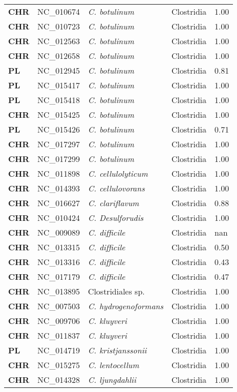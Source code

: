\begin{adjustwidth}{-3cm}{2cm}
{\begin{supertabular}{>{\bfseries}l|p{0.1\textwidth}p{0.14\textwidth}l|l}
CHR & NC\_010674 & \textit{C. botulinum} & Clostridia & 1.00\\
CHR & NC\_010723 & \textit{C. botulinum} & Clostridia & 1.00\\
CHR & NC\_012563 & \textit{C. botulinum} & Clostridia & 1.00\\
CHR & NC\_012658 & \textit{C. botulinum} & Clostridia & 1.00\\
PL & NC\_012945 & \textit{C. botulinum} & Clostridia & 0.81\\
PL & NC\_015417 & \textit{C. botulinum} & Clostridia & 1.00\\
PL & NC\_015418 & \textit{C. botulinum} & Clostridia & 1.00\\
CHR & NC\_015425 & \textit{C. botulinum} & Clostridia & 1.00\\
PL & NC\_015426 & \textit{C. botulinum} & Clostridia & 0.71\\
CHR & NC\_017297 & \textit{C. botulinum} & Clostridia & 1.00\\
CHR & NC\_017299 & \textit{C. botulinum} & Clostridia & 1.00\\
CHR & NC\_011898 & \textit{C. cellulolyticum} & Clostridia & 1.00\\
CHR & NC\_014393 & \textit{C. cellulovorans} & Clostridia & 1.00\\
CHR & NC\_016627 & \textit{C. clariflavum} & Clostridia & 0.88\\
CHR & NC\_010424 & \textit{C. Desulforudis} & Clostridia & 1.00\\
CHR & NC\_009089 & \textit{C. difficile} & Clostridia & nan\\
CHR & NC\_013315 & \textit{C. difficile} & Clostridia & 0.50\\
CHR & NC\_013316 & \textit{C. difficile} & Clostridia & 0.43\\
CHR & NC\_017179 & \textit{C. difficile} & Clostridia & 0.47\\
CHR & NC\_013895 & Clostridiales sp. & Clostridia & 1.00\\
CHR & NC\_007503 & \textit{C. hydrogenoformans} & Clostridia & 1.00\\
CHR & NC\_009706 & \textit{C. kluyveri} & Clostridia & 1.00\\
CHR & NC\_011837 & \textit{C. kluyveri} & Clostridia & 1.00\\
PL & NC\_014719 & \textit{C. kristjanssonii} & Clostridia & 1.00\\
CHR & NC\_015275 & \textit{C. lentocellum} & Clostridia & 1.00\\
CHR & NC\_014328 & \textit{C. ljungdahlii} & Clostridia & 1.00\\

\end{supertabular}}
\end{adjustwidth}
